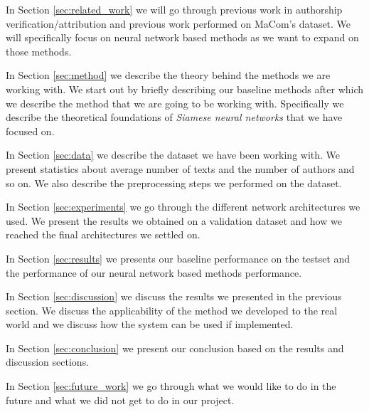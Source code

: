 In Section \ref{sec:related_work} we will go through previous work in authorship
verification/attribution and previous work performed on MaCom's dataset. We will
specifically focus on neural network based methods as we want to expand on those
methods.

In Section \ref{sec:method} we describe the theory behind the methods we are
working with. We start out by briefly describing our baseline methods after
which we describe the method that we are going to be working with. Specifically
we describe the theoretical foundations of \textit{Siamese neural networks} that
we have focused on.

In Section \ref{sec:data} we describe the dataset we have been working with. We
present statistics about average number of texts and the number of authors and
so on. We also describe the preprocessing steps we performed on the dataset.

In Section \ref{sec:experiments} we go through the different network
architectures we used. We present the results we obtained on a validation
dataset and how we reached the final architectures we settled on.

In Section \ref{sec:results} we presents our baseline performance on the testset
and the performance of our neural network based methods performance.

In Section \ref{sec:discussion} we discuss the results we presented in the
previous section. We discuss the applicability of the method we developed to the
real world and we discuss how the system can be used if implemented.

In Section \ref{sec:conclusion} we present our conclusion based on the results
and discussion sections.

In Section \ref{sec:future_work} we go through what we would like to do in the
future and what we did not get to do in our project.
